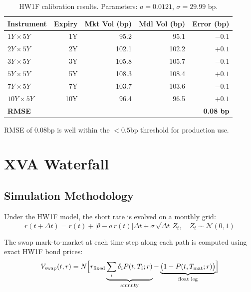 \documentclass[11pt,a4paper]{article}
\begin{document}
\begin{table}[H]
\centering
\begin{tabular}{lrrrr}
\toprule
\textbf{Instrument} & \textbf{Expiry} & \textbf{Mkt Vol (bp)} & \textbf{Mdl Vol (bp)} & \textbf{Error (bp)} \\
\midrule
$1Y{\times}5Y$  & 1Y  & 95.2  & 95.1  & $-0.1$ \\
$2Y{\times}5Y$  & 2Y  & 102.1 & 102.2 & $+0.1$ \\
$3Y{\times}5Y$  & 3Y  & 105.8 & 105.7 & $-0.1$ \\
$5Y{\times}5Y$  & 5Y  & 108.3 & 108.4 & $+0.1$ \\
$7Y{\times}5Y$  & 7Y  & 103.7 & 103.6 & $-0.1$ \\
$10Y{\times}5Y$ & 10Y &  96.4 &  96.5 & $+0.1$ \\
\midrule
\textbf{RMSE}   &     &       &       & \textbf{0.08 bp} \\
\bottomrule
\end{tabular}
\caption{HW1F calibration results. Parameters: $a = 0.0121$, $\sigma = 29.99\text{ bp}$.}
\end{table}

\noindent RMSE of 0.08bp is well within the $<0.5$bp threshold for production use.

\section{XVA Waterfall}
\label{sec:xva}

\subsection{Simulation Methodology}

Under the HW1F model, the short rate is evolved on a monthly grid:
\begin{equation}
  r(t + \Delta t) = r(t) + \bigl[\theta - a \, r(t)\bigr]\Delta t + \sigma \, \sqrt{\Delta t} \, Z_t,
  \quad Z_t \sim \mathcal{N}(0,1)
\end{equation}

The swap mark-to-market at each time step along each path is computed using
exact HW1F bond prices:
\begin{equation}
  V_\text{swap}(t, r) = N \Bigl[
    r_\text{fixed} \underbrace{\sum_{i} \delta_i P(t, T_i; r)}_{\text{annuity}}
    - \underbrace{\bigl(1 - P(t, T_\text{mat}; r)\bigr)}_{\text{float leg}}
  \Bigr]
\end{equation}
\end{document}
